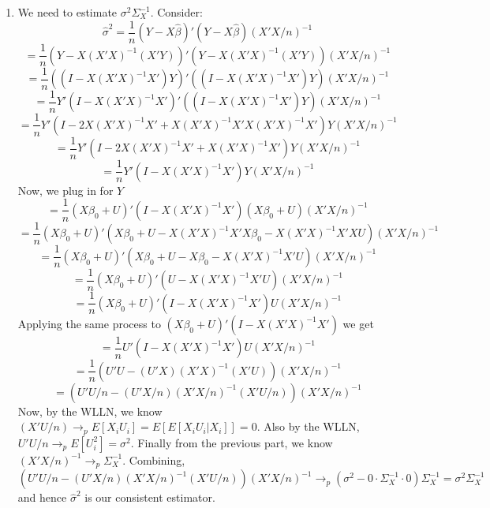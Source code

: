 \documentclass[10pt,letter]{article}
\begin{document}
\begin{enumerate}[label=(\alph*)]
\item We need to estimate $\sigma^2\Sigma_X^{-1}$.
Consider:
\[ \hat{\sigma}^2 = \frac{1}{n}(Y-X\hat{\beta})'(Y-X\hat{\beta})(X'X/n )^{-1} \]
\[ = \frac{1}{n}(Y-X(X'X)^{-1}(X'Y))'(Y-X(X'X)^{-1}(X'Y))(X'X/n )^{-1}  \]
\[ = \frac{1}{n}((I-X(X'X)^{-1}X')Y)'((I-X(X'X)^{-1}X')Y)(X'X/n )^{-1}  \]
\[ = \frac{1}{n}Y'(I-X(X'X)^{-1}X')'((I-X(X'X)^{-1}X')Y)(X'X/n )^{-1}  \]
\[ = \frac{1}{n}Y'(I-2X(X'X)^{-1}X' + X(X'X)^{-1}X'X(X'X)^{-1}X')Y(X'X/n )^{-1}  \]
\[ = \frac{1}{n}Y'(I-2X(X'X)^{-1}X' + X(X'X)^{-1}X')Y(X'X/n )^{-1}  \]
\[ = \frac{1}{n}Y'(I-X(X'X)^{-1}X')Y(X'X/n )^{-1}  \]
Now, we plug in for $Y$
\[ = \frac{1}{n}(X\beta_0 + U)'(I-X(X'X)^{-1}X')(X\beta_0 + U)(X'X/n )^{-1}  \]
\[ = \frac{1}{n}(X\beta_0 + U)'(X\beta_0 + U -X(X'X)^{-1}X'X\beta_0 -X(X'X)^{-1}X'X U)(X'X/n )^{-1}  \]
\[ = \frac{1}{n}(X\beta_0 + U)'(X\beta_0 + U -X\beta_0 -X(X'X)^{-1}X' U)(X'X/n )^{-1}  \]
\[ = \frac{1}{n}(X\beta_0 + U)'( U -X(X'X)^{-1}X' U)(X'X/n )^{-1}  \]
\[ = \frac{1}{n}(X\beta_0 + U)'( I -X(X'X)^{-1}X' )U(X'X/n )^{-1}  \]
Applying the same process to $(X\beta_0 + U)'( I -X(X'X)^{-1}X' )$ we get
\[ = \frac{1}{n}U'( I -X(X'X)^{-1}X' )U(X'X/n )^{-1}  \]
\[ = \frac{1}{n}(U'U  -(U'X)(X'X)^{-1}(X'U))(X'X/n )^{-1}  \]
\[ = (U'U/n  - (U'X/n)(X'X/n)^{-1}(X'U/n))(X'X/n )^{-1}  \]
Now, by the WLLN, we know $(X'U/n) \to_p E[X_i U_i] = E[E[X_i U_i|X_i]] = 0$. Also by the WLLN, $U'U/n \to_p E[U_i^2] = \sigma^2$. Finally from the previous part, we know $(X'X/n )^{-1} \to_p \Sigma_X^{-1}$. Combining,
\[ (U'U/n  - (U'X/n)(X'X/n)^{-1}(X'U/n))(X'X/n )^{-1} \to_p (\sigma^2 - 0\cdot \Sigma_X^{-1} \cdot 0) \Sigma_X^{-1} = \sigma^2 \Sigma_X^{-1}\]
and hence $\hat{\sigma}^2$ is our consistent estimator.

\end{enumerate}
\end{document}
